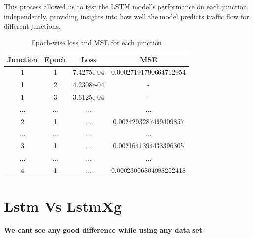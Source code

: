 \documentclass{IEEEtran}
\begin{document}
This process allowed us to test the LSTM model's performance on each junction independently, providing insights into how well the model predicts traffic flow for different junctions.
\begin{table}[h]
    \centering
    \begin{tabular}{|c|c|c|c|}
        \hline
        \textbf{Junction} & \textbf{Epoch} & \textbf{Loss} & \textbf{MSE} \\ \hline
        1 & 1 & 7.4275e-04 & 0.00027191790664712954 \\
        1 & 2 & 4.2308e-04 & - \\
        1 & 3 & 3.6125e-04 & - \\
        ... & ... & ... & ... \\
        2 & 1 & ... & 0.0024293287499409857 \\
        ... & ... & ... & ... \\
        3 & 1 & ... & 0.0021641394433396305 \\
        ... & ... & ... & ... \\
        4 & 1 & ... & 0.00023006804988252418 \\
        \hline
    \end{tabular}
    \caption{Epoch-wise loss and MSE for each junction}
    \label{tab:lstm_results}
\end{table}
\section{Lstm Vs LstmXg}
\textbf{We cant see any good difference while using any data set}
\end{document}
